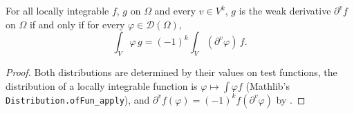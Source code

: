 \begin{lemma}
\label{lem:weak-derivative-integral}
\leanok
{}
For all locally integrable $f$, $g$ on $\Omega$ and every $v \in V^k$, $g$ is the weak
derivative $\partial^v f$ on $\Omega$ if and only if for every $\varphi \in \mathcal D(\Omega)$,
\[
  \int_V \varphi \, g = (-1)^k \int_V (\partial^v \varphi) \, f .
\]
\end{lemma}

\begin{proof}
\leanok
Both distributions are determined by their values on test functions, the distribution of a
locally integrable function is $\varphi \mapsto \int \varphi f$ (Mathlib's
\texttt{Distribution.\allowbreak ofFun\_\allowbreak apply}), and
$\partial^v f(\varphi) = (-1)^k f(\partial^v \varphi)$ by .
\end{proof}

